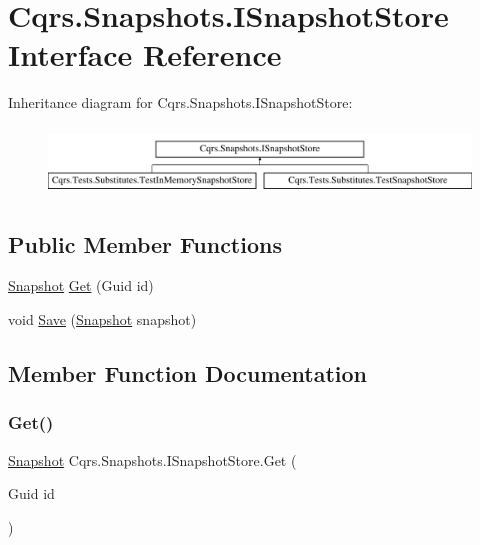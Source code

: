 \hypertarget{interfaceCqrs_1_1Snapshots_1_1ISnapshotStore}{}\section{Cqrs.\+Snapshots.\+I\+Snapshot\+Store Interface Reference}
\label{interfaceCqrs_1_1Snapshots_1_1ISnapshotStore}
Inheritance diagram for Cqrs.\+Snapshots.\+I\+Snapshot\+Store\+:\begin{figure}[H]
\begin{center}
\leavevmode
\includegraphics[height=1.818182cm]{interfaceCqrs_1_1Snapshots_1_1ISnapshotStore}
\end{center}
\end{figure}
\subsection*{Public Member Functions}
\begin{DoxyCompactItemize}
\item 
\hyperlink{classCqrs_1_1Snapshots_1_1Snapshot}{Snapshot} \hyperlink{interfaceCqrs_1_1Snapshots_1_1ISnapshotStore_a08af77cd80a9134f17033a479325330c}{Get} (Guid id)
\item 
void \hyperlink{interfaceCqrs_1_1Snapshots_1_1ISnapshotStore_a6e99c620115ce8a0648a83bf2ce05527}{Save} (\hyperlink{classCqrs_1_1Snapshots_1_1Snapshot}{Snapshot} snapshot)
\end{DoxyCompactItemize}


\subsection{Member Function Documentation}
\mbox{\label{interfaceCqrs_1_1Snapshots_1_1ISnapshotStore_a08af77cd80a9134f17033a479325330c}} 
\subsubsection{\texorpdfstring{Get()}{Get()}}
{\footnotesize\ttfamily \hyperlink{classCqrs_1_1Snapshots_1_1Snapshot}{Snapshot} Cqrs.\+Snapshots.\+I\+Snapshot\+Store.\+Get (\begin{DoxyParamCaption}\item[{Guid}]{id }\end{DoxyParamCaption})}



